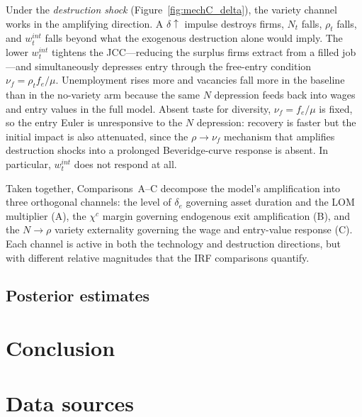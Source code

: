 \documentclass[authoryear, review, 12pt]{elsarticle}
\begin{document}
	Under the \emph{destruction shock} (Figure~\ref{fig:mechC_delta}),
	the variety channel works in the amplifying direction. A $\delta\uparrow$
	impulse destroys firms, $N_t$ falls, $\rho_t$ falls, and $w_t^{int}$
	falls beyond what the exogenous destruction alone would imply. The lower
	$w_t^{int}$ tightens the JCC---reducing the surplus firms extract from
	a filled job---and simultaneously depresses entry through the free-entry
	condition $\nu_f=\rho_t f_e/\mu$. Unemployment rises more and vacancies
	fall more in the baseline than in the no-variety arm because the same $N$
	depression feeds back into wages and entry values in the full model.
	Absent taste for diversity, $\nu_f=f_e/\mu$ is fixed, so the entry Euler is
	unresponsive to the $N$ depression: recovery is faster but the initial
	impact is also attenuated, since the $\rho\to\nu_f$ mechanism that
	amplifies destruction shocks into a prolonged Beveridge-curve response
	is absent. In particular, $w_t^{int}$ does not respond at all.

	Taken together, Comparisons~A--C decompose the model's amplification
	into three orthogonal channels: the level of $\delta_e$ governing
	asset duration and the LOM multiplier (A), the $\chi^c$ margin governing
	endogenous exit amplification (B), and the $N\to\rho$ variety externality
	governing the wage and entry-value response (C). Each channel is active
	in both the technology and destruction directions, but with different
	relative magnitudes that the IRF comparisons quantify.
	\subsection{Posterior estimates}\label{sec:posterior}
	\section{Conclusion}\label{ref:conclusion}
	\newpage
	\appendix

	\section{Data sources}\label{app:data_sources}
\end{document}
